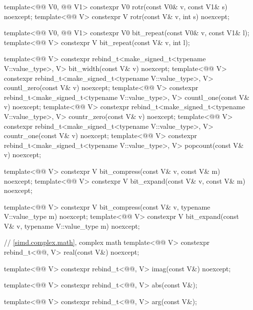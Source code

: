 \begin{codeblock}
{  template<@@ V0, @@ V1>
    constexpr V0 rotr(const V0& v, const V1& s) noexcept;
  template<@@ V>
    constexpr V  rotr(const V& v, int s) noexcept;

  template<@@ V0, @@ V1>
    constexpr V0 bit_repeat(const V0& v, const V1& l);
  template<@@ V>
    constexpr V  bit_repeat(const V& v, int l);

  template<@@ V>
    constexpr rebind_t<make_signed_t<typename V::value_type>, V>
      bit_width(const V& v) noexcept;
  template<@@ V>
    constexpr rebind_t<make_signed_t<typename V::value_type>, V>
      countl_zero(const V& v) noexcept;
  template<@@ V>
    constexpr rebind_t<make_signed_t<typename V::value_type>, V>
      countl_one(const V& v) noexcept;
  template<@@ V>
    constexpr rebind_t<make_signed_t<typename V::value_type>, V>
      countr_zero(const V& v) noexcept;
  template<@@ V>
    constexpr rebind_t<make_signed_t<typename V::value_type>, V>
      countr_one(const V& v) noexcept;
  template<@@ V>
    constexpr rebind_t<make_signed_t<typename V::value_type>, V>
      popcount(const V& v) noexcept;

  template<@@ V>
    constexpr V bit_compress(const V& v, const V& m) noexcept;
  template<@@ V>
    constexpr V bit_expand(const V& v, const V& m) noexcept;

  template<@@ V>
    constexpr V bit_compress(const V& v, typename V::value_type m) noexcept;
  template<@@ V>
    constexpr V bit_expand(const V& v, typename V::value_type m) noexcept;

  // \ref{simd.complex.math}, complex math
  template<@@ V>
    constexpr rebind_t<@@, V> real(const V&) noexcept;

  template<@@ V>
    constexpr rebind_t<@@, V> imag(const V&) noexcept;

  template<@@ V>
    constexpr rebind_t<@@, V> abs(const V&);

  template<@@ V>
    constexpr rebind_t<@@, V> arg(const V&);

}
\end{codeblock}
